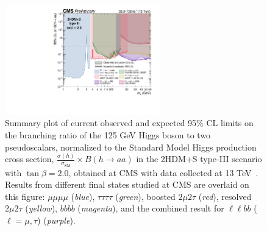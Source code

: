   \begin{figure}[h]
    \begin{center}
      \includegraphics[width=0.6\textwidth]{figures/ch-10-results/summary_plot_full_run2_plot_BRaa_Type3_tanbeta2.pdf}
    \end{center}
    \caption[Summary plot of current observed and expected 95\% CL limits on the branching ratio of the 125 GeV Higgs boson to two pseudoscalars, normalized to the Standard Model Higgs production cross-section, $\frac{\sigma(h)}{\sigma_{\text{SM}}} \times B(h \rightarrow aa)$, in the 2HDM+S type III scenario with $\tan\beta = 2.0$, obtained at CMS with data collected at 13 TeV.]{Summary plot of current observed and expected 95\% CL limits on the branching ratio of the 125 GeV Higgs boson to two pseudoscalars, normalized to the Standard Model Higgs production cross section, $\frac{\sigma(h)}{\sigma_{\text{SM}}} \times B(h \rightarrow aa)$ in the 2HDM+S type-III scenario with $\tan\beta = 2.0$, obtained at CMS with data collected at 13 TeV~\cite{twiki_2HDM+S_summary-plots}. Results from different final states studied at CMS are overlaid on this figure: $\mu\mu\mu\mu$ (\textit{blue}), $\tau\tau\tau\tau$ (\textit{green}), boosted $2\mu 2\tau$ (\textit{red}), resolved $2\mu 2\tau$ (\textit{yellow}), $bbbb$ (\textit{magenta}), and the combined result for $\ell\ell bb$ ($\ell = \mu, \tau$) (\textit{purple}).}
      \label{fig:summary_plot_typeIII_tan_beta_2p0}
  \end{figure}
  
